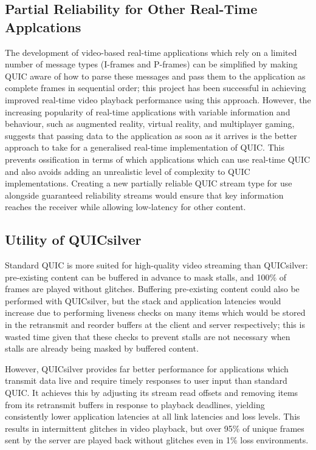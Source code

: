 \documentclass{mpaper}
\begin{document}
\subsection{Partial Reliability for Other Real-Time Applcations}
The development of video-based real-time applications which rely on a limited number of message types (I-frames and P-frames) can be simplified by making QUIC aware of how to parse these messages and pass them to the application as complete frames in sequential order; this project has been successful in achieving improved real-time video playback performance using this approach. However, the increasing popularity of real-time applications with variable information and behaviour, such as augmented reality, virtual reality, and multiplayer gaming, suggests that passing data to the application as soon as it arrives is the better approach to take for a generalised real-time implementation of QUIC. This prevents ossification in terms of which applications which can use real-time QUIC and also avoids adding an unrealistic level of complexity to QUIC implementations. Creating a new partially reliable QUIC stream type for use alongside guaranteed reliability streams would ensure that key information reaches the receiver while allowing low-latency for other content.


\subsection{Utility of QUICsilver}

Standard QUIC is more suited for high-quality video streaming than QUICsilver: pre-existing content can be buffered in advance to mask stalls, and 100\% of frames are played without glitches. Buffering pre-existing content could also be performed with QUICsilver, but the stack and application latencies would increase due to performing liveness checks on many items which would be stored in the retransmit and reorder buffers at the client and server respectively; this is wasted time given that these checks to prevent stalls are not necessary when stalls are already being masked by buffered content.

However, QUICsilver provides far better performance for applications which transmit data live and require timely responses to user input than standard QUIC. It achieves this by adjusting its stream read offsets and removing items from its retransmit buffers in response to playback deadlines, yielding consistently lower application latencies at all link latencies and loss levels. This results in intermittent glitches in video playback, but over 95\% of unique frames sent by the server are played back without glitches even in 1\% loss environments.
\end{document}
